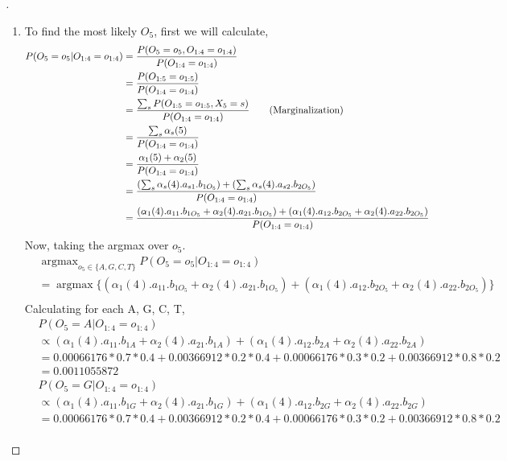 \documentclass[a4paper, 12pt]{article}
\DeclareMathOperator*{\argmax}{argmax}
\begin{document}
\begin{proof}[]
\begin{enumerate}[label={\color{blue}{\textbf{3.\arabic*})}}]
    \item 
        To find the most likely $O_5$, first we will calculate,
        \begin{align*}
            P(O_5=o_5 | O_{1:4}=o_{1:4}) &= \frac{P(O_5=o_5, O_{1:4}=o_{1:4})}{P(O_{1:4}=o_{1:4})}\\
            &= \frac{P(O_{1:5}=o_{1:5})}{P(O_{1:4}=o_{1:4})}\\
            &=\frac{\sum\nolimits_sP(O_{1:5}=o_{1:5}, X_5 = s)}{P(O_{1:4}=o_{1:4})}{\tag*{(Marginalization)}}\\
            &=\frac{\sum\nolimits_s\alpha_s(5)}{P(O_{1:4}=o_{1:4})}\\
            &=\frac{\alpha_1(5) + \alpha_2(5)}{P(O_{1:4}=o_{1:4})}\\
            &=\frac{(\sum\nolimits_s\alpha_s(4).a_{s1}.b_{1O_5}) + (\sum\nolimits_s\alpha_s(4).a_{s2}.b_{2O_5})}{P(O_{1:4}=o_{1:4})}\\
            &=\frac{(\alpha_1(4).a_{11}.b_{1O_5} + \alpha_2(4).a_{21}.b_{1O_5}) + (\alpha_1(4).a_{12}.b_{2O_5} + \alpha_2(4).a_{22}.b_{2O_5})}{P(O_{1:4}=o_{1:4})}\\
        \end{align*}
        Now, taking the argmax over $o_5$.
    \begin{align*}
        &\argmax_{o_5 \in \{A, G, C, T\}}P(O_5=o_5 | O_{1:4} = o_{1:4})\\
            &= \argmax\{(\alpha_1(4).a_{11}.b_{1O_5} + \alpha_2(4).a_{21}.b_{1O_5}) + (\alpha_1(4).a_{12}.b_{2O_5} + \alpha_2(4).a_{22}.b_{2O_5})\}\\
    \end{align*}
    Calculating for each A, G, C, T,
    \begin{align*}
        &P(O_5=A | O_{1:4}=o_{1:4})\\
        &\propto (\alpha_1(4).a_{11}.b_{1A} + \alpha_2(4).a_{21}.b_{1A}) + (\alpha_1(4).a_{12}.b_{2A} + \alpha_2(4).a_{22}.b_{2A})\\
        &= 0.00066176*0.7*0.4 + 0.00366912*0.2*0.4 + 0.00066176*0.3*0.2 + 0.00366912*0.8*0.2\\
        &= 0.0011055872
    \end{align*}
    \begin{align*}
        &P(O_5=G | O_{1:4}=o_{1:4})\\
        &\propto (\alpha_1(4).a_{11}.b_{1G} + \alpha_2(4).a_{21}.b_{1G}) + (\alpha_1(4).a_{12}.b_{2G} + \alpha_2(4).a_{22}.b_{2G})\\
        &= 0.00066176*0.7*0.4 + 0.00366912*0.2*0.4 + 0.00066176*0.3*0.2 + 0.00366912*0.8*0.2\\

\end{align*}
\end{enumerate}
\end{proof}
\end{document}
